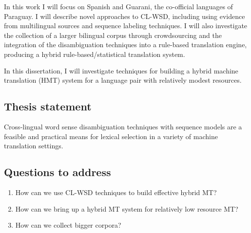 In this work I will focus on Spanish and Guarani, the co-official languages of
Paraguay.  I will describe novel approaches to CL-WSD, including using evidence
from multilingual sources and sequence labeling techniques.
I will also investigate the collection of a larger bilingual corpus through
crowdsourcing and the integration of the disambiguation techniques into a
rule-based translation engine, producing a hybrid rule-based/statistical
translation system.

In this dissertation, I will investigate techniques for building a hybrid
machine translation (HMT) system for a language pair with relatively modest
resources.

\subsection{Thesis statement}
Cross-lingual word sense disambiguation techniques with sequence models are a
feasible and practical means for lexical selection in a variety of machine
translation settings.

\subsection{Questions to address}
\begin{enumerate}
\item How can we use CL-WSD techniques to build effective hybrid MT?
\item How can we bring up a hybrid MT system for relatively low resource MT?
\item How can we collect bigger corpora?
\end{enumerate}


